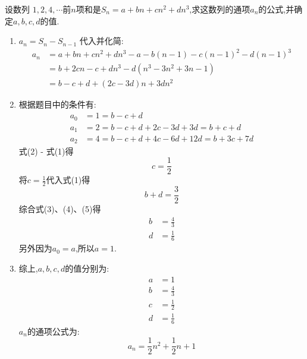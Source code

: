 \begin{questions}
	\question 设数列 $1,2,4, \cdots$前$n$项和是$S_n = a + bn + cn^2 +
		dn^3$,求这数列的通项$a_n$的公式,并确定$a,b,c,d$的值.
	\begin{solution}
		\begin{enumerate}[label=\arabic*.]
			\item $a_n = S_n - S_{n-1}$
			      代入并化简:
			      \begin{align*}
				      a_n & = a + bn + cn^2 + dn^3 - a - b(n-1) - c(n-1)^2 - d(n-1)^3 \\
				          & = b + 2cn -c + dn^3 -d(n^3 -3n^2 + 3n - 1)                \\
				          & = b - c + d + (2c - 3d)n + 3dn^2
			      \end{align*}
			\item 根据题目中的条件有:
			      \begin{align*}
				      a_0 & = 1 = b - c + d \tag{1}                               \\
				      a_1 & = 2 = b - c + d + 2c - 3d + 3d = b + c + d\tag{2}     \\
				      a_2 & = 4 = b - c + d + 4c - 6d + 12d = b + 3c + 7d \tag{3}
			      \end{align*}
			      式(2) - 式(1)得 \[c=\frac12 \tag{4}\]
			      将$c=\frac12$代入式(1)得 \[b+d=\frac32\tag{5}\]
			      综合式(3)、(4)、(5)得
			      \begin{align*}
				      b & = \frac43 \\
				      d & = \frac16
			      \end{align*}
			      另外因为$a_0 = a$,所以$a=1$.
			\item 综上,$a,b,c,d$的值分别为:
			      \begin{align*}
				      a & = 1       \\
				      b & = \frac43 \\
				      c & = \frac12 \\
				      d & = \frac16
			      \end{align*}
			      $a_n$的通项公式为:
			      \begin{equation*}
				      a_n = \frac12n^2 + \frac12n + 1
			      \end{equation*}

		\end{enumerate}

	\end{solution}
	\begin{center}

\end{center}
\end{questions}
